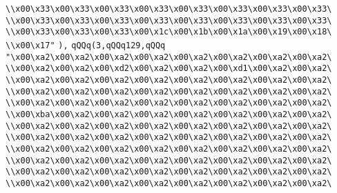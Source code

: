 \verb|\\x00\x33\x00\x33\x00\x33\x00\x33\x00\x33\x00\x33\x00\x33\x00\x33\|\newline
\verb|\\x00\x33\x00\x33\x00\x33\x00\x33\x00\x33\x00\x33\x00\x33\x00\x33\|\newline
\verb|\\x00\x33\x00\x33\x00\x33\x00\x1c\x00\x1b\x00\x1a\x00\x19\x00\x18\|\newline
\verb|\\x00\x17"|\newline
\verb|),|\newline
\verb|qQQq(3,qQQq129,qQQq|\newline
\verb|"\x00\xa2\x00\xa2\x00\xa2\x00\xa2\x00\xa2\x00\xa2\x00\xa2\x00\xa2\|\newline
\verb|\\x00\xa2\x00\xa2\x00\xd2\x00\xa2\x00\xa2\x00\xd1\x00\xa2\x00\xa2\|\newline
\verb|\\x00\xa2\x00\xa2\x00\xa2\x00\xa2\x00\xa2\x00\xa2\x00\xa2\x00\xa2\|\newline
\verb|\\x00\xa2\x00\xa2\x00\xa2\x00\xa2\x00\xa2\x00\xa2\x00\xa2\x00\xa2\|\newline
\verb|\\x00\xa2\x00\xa2\x00\xa2\x00\xa2\x00\xa2\x00\xa2\x00\xa2\x00\xa2\|\newline
\verb|\\x00\xba\x00\xa2\x00\xa2\x00\xa2\x00\xa2\x00\xa2\x00\xa2\x00\xa2\|\newline
\verb|\\x00\xa2\x00\xa2\x00\xa2\x00\xa2\x00\xa2\x00\xa2\x00\xa2\x00\xa2\|\newline
\verb|\\x00\xa2\x00\xa2\x00\xa2\x00\xa2\x00\xa2\x00\xa2\x00\xa2\x00\xa2\|\newline
\verb|\\x00\xa2\x00\xa2\x00\xa2\x00\xa2\x00\xa2\x00\xa2\x00\xa2\x00\xa2\|\newline
\verb|\\x00\xa2\x00\xa2\x00\xa2\x00\xa2\x00\xa2\x00\xa2\x00\xa2\x00\xa2\|\newline
\verb|\\x00\xa2\x00\xa2\x00\xa2\x00\xa2\x00\xa2\x00\xa2\x00\xa2\x00\xa2\|\newline
\verb|\\x00\xa2\x00\xa2\x00\xa2\x00\xa2\x00\xa2\x00\xa2\x00\xa2\x00\xa2\|\newline
